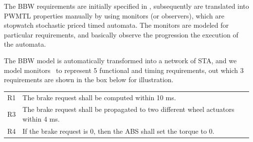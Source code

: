 The BBW requirements are initially specified in \resa, subsequently are translated into PWMTL properties manually by using monitors (or observers), which are stopwatch stochastic priced timed automata. The monitors are modeled for particular requirements, and basically observe the progression the execution of the automata.
\begin{example}\label{ex_resa}
	The BBW model is automatically transformed into a network of STA, and we model monitors~\cite{Filipovikj2018SimppaalModels} to represent 5 functional and timing requirements, out which 3 requirements are shown in the box below for illustration. 
	\vspace{0.2cm}
\begin{elaboration}{0.9}
	\small
	{}
	\begin{tabular}{lp{}}
	R1 & The brake request shall be computed within 10 ms. \\
	R3 & The brake request shall be propagated to two different wheel actuators within 4 ms.\\
	R4 & If the brake request is 0, then the ABS shall set the torque to 0. \\
\end{tabular}
\end{elaboration}
\end{example}

